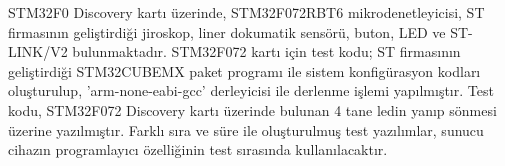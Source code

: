 STM32F0 Discovery kartı üzerinde, STM32F072RBT6 mikrodenetleyicisi, ST firmasının geliştirdiği jiroskop, liner dokumatik sensörü, buton, LED ve ST-LINK/V2 bulunmaktadır. STM32F072 kartı için test kodu; ST firmasının geliştirdiği STM32CUBEMX paket programı ile sistem konfigürasyon kodları oluşturulup, 'arm-none-eabi-gcc' derleyicisi ile derlenme işlemi yapılmıştır. Test kodu, STM32F072 Discovery kartı üzerinde bulunan 4 tane ledin yanıp sönmesi üzerine yazılmıştır. Farklı sıra ve süre ile oluşturulmuş test yazılımlar, sunucu cihazın programlayıcı özelliğinin test sırasında kullanılacaktır.



